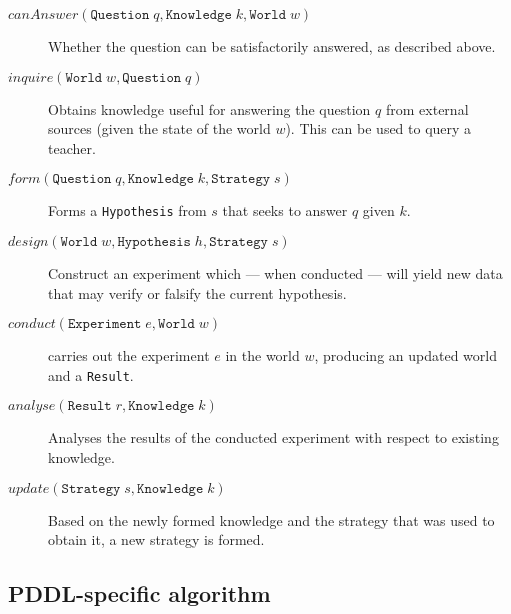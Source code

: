 \documentclass[master.tex]{subfiles}
\begin{document}
\begin{description}
    \item[$canAnswer( \texttt{Question} \; q
                    , \texttt{Knowledge} \; k
                    , \texttt{World} \; w
                    )
         $]
        Whether the question can be satisfactorily answered, as described above.

    \item[$inquire( \texttt{World} \; w
                  , \texttt{Question} \; q
                  )
         $]
        Obtains knowledge useful for answering the question $q$ from external sources (given the state of the world $w$). This can be used to query a teacher.

    \item[$form( \texttt{Question} \; q
               , \texttt{Knowledge} \; k
               , \texttt{Strategy} \; s
               )
         $]
        Forms a \texttt{Hypothesis} from $s$ that seeks to answer $q$ given $k$.

    \item[$design( \texttt{World} \; w
                 , \texttt{Hypothesis} \; h
                 , \texttt{Strategy} \; s
                 )
         $]
        Construct an experiment which --- when conducted --- will yield new data that may verify or falsify the current hypothesis.

    \item[$conduct( \texttt{Experiment} \; e
                  , \texttt{World} \; w
                  )
         $]
        carries out the experiment $e$ in the world $w$, producing an updated world and a \texttt{Result}.

    \item[$analyse( \texttt{Result} \; r
                  , \texttt{Knowledge} \; k
                  )
         $]
        Analyses the results of the conducted experiment with respect to existing knowledge.

    \item[$update( \texttt{Strategy} \; s
                 , \texttt{Knowledge} \; k
                 )
         $]
        Based on the newly formed knowledge and the strategy that was used to obtain it, a new strategy is formed.
\end{description}

\subsection{PDDL-specific algorithm}
\end{document}
